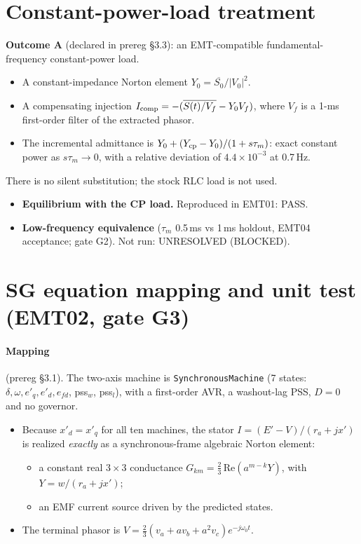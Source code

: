 \documentclass[10pt,a4paper]{article}
\newcommand{\blocked}{\textsf{UNRESOLVED (BLOCKED)}}
\begin{document}
\section{Constant-power-load treatment}

\textbf{Outcome A} (declared in prereg \S3.3): an EMT-compatible
fundamental-frequency constant-power load.
\begin{itemize}
\item A constant-impedance Norton element $Y_0=\overline{S_0}/|V_0|^2$.
\item A compensating injection
  $I_{\rm comp}=-(\overline{S(t)/V_f}-Y_0V_f)$, where $V_f$ is a 1-ms
  first-order filter of the extracted phasor.
\item The incremental admittance is $Y_0+(Y_{\rm cp}-Y_0)/(1+s\tau_m)$: exact
  constant power as $s\tau_m\to0$, with a relative deviation of
  $4.4\times10^{-3}$ at 0.7\,Hz.
\end{itemize}
There is no silent substitution; the stock RLC load is not used.

\begin{itemize}
\item \textbf{Equilibrium with the CP load.} Reproduced in EMT01: PASS.
\item \textbf{Low-frequency equivalence} ($\tau_m$ 0.5\,ms vs 1\,ms holdout,
  EMT04 acceptance; gate G2). Not run: \blocked.
\end{itemize}

\section{SG equation mapping and unit test (EMT02, gate G3)}

\paragraph{Mapping} (prereg \S3.1). The two-axis machine is
\texttt{SynchronousMachine} (7 states: $\delta,\omega,e'_q,e'_d,e_{fd}$,
pss$_w$, pss$_l$), with a first-order AVR, a washout-lag PSS, $D=0$ and no
governor.
\begin{itemize}
\item Because $x'_d=x'_q$ for all ten machines, the stator
  $I=(E'-V)/(r_a+jx')$ is realized \emph{exactly} as a synchronous-frame
  algebraic Norton element:
  \begin{itemize}
  \item a constant real $3\times3$ conductance
    $G_{km}=\tfrac23\,\mathrm{Re}(a^{m-k}Y)$, with $Y=w/(r_a+jx')$;
  \item an EMF current source driven by the predicted states.
  \end{itemize}
\item The terminal phasor is
  $V=\tfrac23(v_a+av_b+a^2v_c)e^{-j\omega_0t}$.
\end{itemize}
\end{document}
